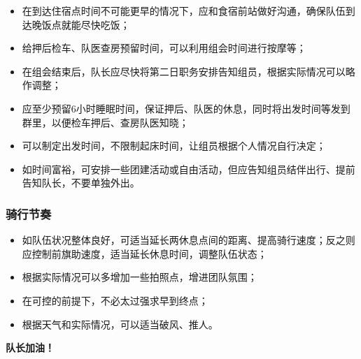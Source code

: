\documentclass[UTF8]{ctexart}
\begin{document}
\begin{itemize}[nosep,left=2em]
    \item 在到达住宿点时间不可能更早的情况下，应和食宿前站做好沟通，确保队伍到达晚饭点就能尽快吃饭；
    \item 给押后检车、队医查房预留时间，可以利用组会时间进行按摩等；
    \item 在组会结束后，队长应尽快将第二日职务安排告知组员，根据实际情况可以略作调整；
    \item 应至少预留6小时睡眠时间，保证押后、队医的休息，同时将出发时间等发到群里，以便检车押后、查房队医知晓；
    \item 可以制定出发时间，不限制起床时间，让组员根据个人情况自行决定；
    \item 如时间富裕，可安排一些团建活动或自由活动，但应告知组员结伴出行、提前告知队长，不要单独外出。
\end{itemize}

\subsubsection{骑行节奏}

\begin{itemize}[nosep,left=2em]
    \item 如队伍状况整体良好，可适当延长两休息点间的距离、提高骑行速度；反之则应控制前旗助速度，适当延长休息时间，调整队伍状态；
    \item 根据实际情况可以多增加一些拍照点，增进团队氛围；
    \item 在可控的前提下，不必太过强求早到终点；
    \item 根据天气和实际情况，可以适当破风、推人。
\end{itemize}
\center\Large{\color{red}\textbf{队长加油！}}
\end{document}
